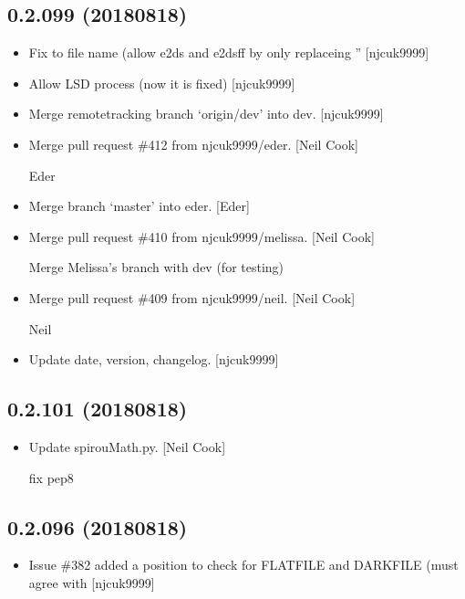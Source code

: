 \documentclass[a4paper,10pt,english]{report}
\begin{document}
\subsection{0.2.099 (2018\sphinxhyphen{}08\sphinxhyphen{}18)}
\label{\detokenize{misc/changelog:id381}}\begin{itemize}
\item {} 
Fix to file name (allow e2ds and e2dsff by only replaceing ”
{[}njcuk9999{]}

\item {} 
Allow LSD process (now it is fixed) {[}njcuk9999{]}

\item {} 
Merge remote\sphinxhyphen{}tracking branch ‘origin/dev’ into dev. {[}njcuk9999{]}

\item {} 
Merge pull request \#412 from njcuk9999/eder. {[}Neil Cook{]}

Eder

\item {} 
Merge branch ‘master’ into eder. {[}Eder{]}

\item {} 
Merge pull request \#410 from njcuk9999/melissa. {[}Neil Cook{]}

Merge Melissa’s branch with dev (for testing)

\item {} 
Merge pull request \#409 from njcuk9999/neil. {[}Neil Cook{]}

Neil

\item {} 
Update date, version, changelog. {[}njcuk9999{]}

\end{itemize}


\subsection{0.2.101 (2018\sphinxhyphen{}08\sphinxhyphen{}18)}
\label{\detokenize{misc/changelog:id382}}\begin{itemize}
\item {} 
Update spirouMath.py. {[}Neil Cook{]}

fix pep8

\end{itemize}


\subsection{0.2.096 (2018\sphinxhyphen{}08\sphinxhyphen{}18)}
\label{\detokenize{misc/changelog:id383}}\begin{itemize}
\item {} 
Issue \#382 \sphinxhyphen{} added a position to check for FLATFILE and DARKFILE (must
agree with  {[}njcuk9999{]}

\end{itemize}
\end{document}
